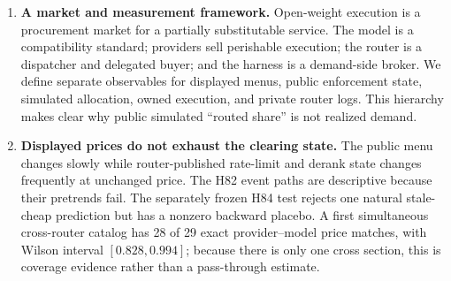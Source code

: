 \documentclass[11pt]{article}
\newcommand{\1}{\mathbf{1}}
\begin{document}
\begin{enumerate}
  \item \textbf{A market and measurement framework.}  Open-weight execution is
  a procurement market for a partially substitutable service.  The model is a
  compatibility standard; providers sell perishable execution; the router is a
  dispatcher and delegated buyer; and the harness is a demand-side broker.  We
  define separate observables for displayed menus, public enforcement state,
  simulated allocation, owned execution, and private router logs.  This hierarchy
  makes clear why public simulated ``routed share'' is not realized demand.

  \item \textbf{Displayed prices do not exhaust the clearing state.}  The public
  menu changes slowly while router-published rate-limit and derank state changes
  frequently at unchanged price.  The H82 event paths are descriptive because
  their pretrends fail.  The separately frozen H84 test rejects one natural
  stale-cheap prediction but has a nonzero backward placebo.  A first simultaneous
  cross-router catalog has 28 of 29 exact provider--model price matches, with
  Wilson interval $[0.828,0.994]$; because there is only one cross section, this
  is coverage evidence rather than a pass-through estimate.


\end{enumerate}
\end{document}
